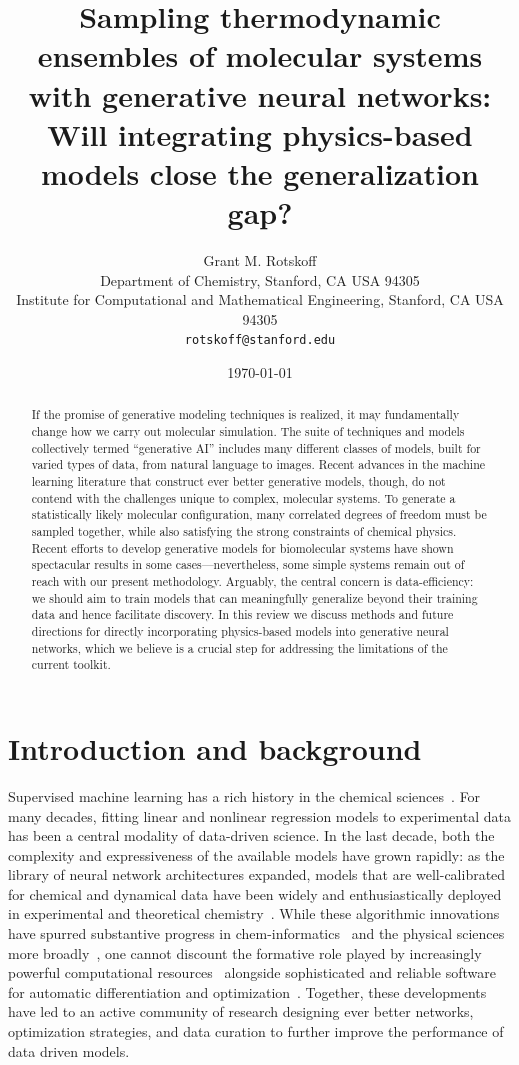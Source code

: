 \documentclass[11pt]{article}
\title{Sampling thermodynamic ensembles of molecular systems with generative neural networks: Will integrating physics-based models close the generalization gap?}
\author{Grant M. Rotskoff\\
Department of Chemistry, Stanford, CA USA 94305\\
Institute for Computational and Mathematical Engineering, Stanford, CA USA 94305\\
\texttt{rotskoff@stanford.edu}}
\date{\today}
\begin{document}
\maketitle

\begin{abstract}
If the promise of generative modeling techniques is realized, it may fundamentally change how we carry out molecular simulation.
The suite of techniques and models collectively termed ``generative AI'' includes many different classes of models, built for varied types of data, from natural language to images.
Recent advances in the machine learning literature that construct ever better generative models, though, do not contend with the challenges unique to complex, molecular systems. 
To generate a statistically likely molecular configuration, many correlated degrees of freedom must be sampled together, while also satisfying the strong constraints of chemical physics. 
Recent efforts to develop generative models for biomolecular systems have shown spectacular results in some cases---nevertheless, some simple systems remain out of reach with our present methodology.
Arguably, the central concern is data-efficiency: we should aim to train models that can meaningfully generalize beyond their training data and hence facilitate discovery.
In this review we discuss methods and future directions for directly incorporating physics-based models into generative neural networks, which we believe is a crucial step for addressing the limitations of the current toolkit.
\end{abstract}


\section{Introduction and background}
\label{sec:intro}


Supervised machine learning has a rich history in the chemical sciences~\cite{lederberg_applications_1969}. 
For many decades, fitting linear and nonlinear regression models to experimental data has been a central modality of data-driven science.
In the last decade, both the complexity and expressiveness of the available models have grown rapidly: as the library of neural network architectures expanded, models that are well-calibrated for chemical and dynamical data have been widely and enthusiastically deployed in experimental and theoretical chemistry~\cite{mater_deep_2019}. 
While these algorithmic innovations have spurred substantive progress in chem-informatics~\cite{mater_deep_2019} and the physical sciences more broadly~\cite{carleo_machine_2019}, one cannot discount the formative role played by increasingly powerful computational resources~\cite{amodei_ai_2018} alongside sophisticated and reliable software for automatic differentiation and optimization~\cite{paszke_pytorch_2019, bradbury_jax_2018, broughton_tensorflow_2020}. 
Together, these developments have led to an active community of research designing ever better networks, optimization strategies, and data curation to further improve the performance of data driven models.
\end{document}
